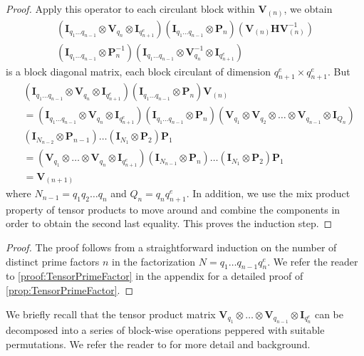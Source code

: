 \begin{proof}
    Apply this operator to each circulant block within \(\bm{V}_{(n)}\), we obtain
    \begin{multline*}
        \left(\bm{I}_{q_1\ldots q_{n-1}} \otimes \bm{V}_{q_n} \otimes \bm{I}_{q_{n+1}^e}\right) \left(\bm{I}_{q_1\ldots q_{n-1}} \otimes \bm{P}_n\right) \left(\bm{V}_{(n)} \bm{H} \bm{V}_{(n)}^{-1}\right) \\
        \left(\bm{I}_{q_1\ldots q_{n-1}} \otimes \bm{P}_n^{-1}\right) \left(\bm{I}_{q_1\ldots q_{n-1}} \otimes \bm{V}_{q_n}^{-1} \otimes \bm{I}_{q_{n+1}^e}\right)
    \end{multline*}
    is a block diagonal matrix, each block circulant of dimension \(q_{n+1}^e \times q_{n+1}^e\). But
    \begin{align*}
        &\left(\bm{I}_{q_1\ldots q_{n-1}} \otimes \bm{V}_{q_n} \otimes \bm{I}_{q_{n+1}^e}\right) \left(\bm{I}_{q_1\ldots q_{n-1}} \otimes \bm{P}_n\right) \bm{V}_{(n)} \\
        &= \left(\bm{I}_{q_1\ldots q_{n-1}} \otimes \bm{V}_{q_n} \otimes \bm{I}_{q_{n+1}^e}\right) \left(\bm{I}_{q_1\ldots q_{n-1}} \otimes \bm{P}_n\right) \left(\bm{V}_{q_1} \otimes \bm{V}_{q_2} \otimes \ldots \otimes \bm{V}_{q_{n-1}} \otimes \bm{I}_{Q_n}\right) \\
        &\left(\bm{I}_{N_{n-2}} \otimes \bm{P}_{n-1}\right) \dots \left(\bm{I}_{N_1} \otimes \bm{P}_2\right) \bm{P}_1 \\
        &= \left(\bm{V}_{q_1} \otimes \ldots \otimes \bm{V}_{q_{n}} \otimes \bm{I}_{q_{n+1}^e}\right) \left(\bm{I}_{N_{n-1}} \otimes \bm{P}_n\right) \dots \left(\bm{I}_{N_1} \otimes \bm{P}_2\right) \bm{P}_1 \\
        &= \bm{V}_{(n+1)}
    \end{align*}
    where \(N_{n-1} = q_1 q_2 \ldots q_n\) and \(Q_n = q_n q_{n+1}^e\). In addition, we use the mix product property of tensor products to move around and combine the components in order to obtain the second last equality. This proves the induction step.
\end{proof}
\else
\begin{proof}
    The proof follows from a straightforward induction on the number of distinct prime factors \(n\) in the factorization \(N = q_1 \ldots q_{n-1} q_n^e\). We refer the reader to \cref{proof:TensorPrimeFactor} in the appendix for a detailed proof of \cref{prop:TensorPrimeFactor}.
\end{proof}
\fi

We briefly recall that the tensor product matrix \(\bm{V}_{q_1} \otimes \ldots \otimes \bm{V}_{q_{n-1}} \otimes \bm{I}_{q_n^e}\) can be decomposed into a series of block-wise operations peppered with suitable permutations. We refer the reader to \cite[Chapter~2]{BOOK:LRTMAC89} for more detail and background.

